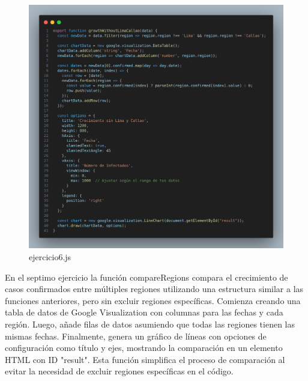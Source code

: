 \begin{figure}[H]
  \centering
  \includegraphics[width=1.0\textwidth]{img/6_js.png}
  \caption{ejercicio6.js}
\end{figure}
En el septimo ejercicio la función compareRegions compara el crecimiento de casos confirmados entre múltiples regiones utilizando una estructura similar a las funciones anteriores, pero sin excluir regiones específicas. Comienza creando una tabla de datos de Google Visualization con columnas para las fechas y cada región. Luego, añade filas de datos asumiendo que todas las regiones tienen las mismas fechas. Finalmente, genera un gráfico de líneas con opciones de configuración como título y ejes, mostrando la comparación en un elemento HTML con ID "result". Esta función simplifica el proceso de comparación al evitar la necesidad de excluir regiones específicas en el código.
